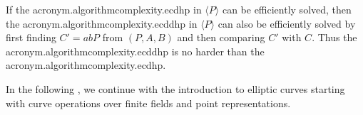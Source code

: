 
If the \acs{acronym.algorithmcomplexity.ecdhp} in $\langle P \rangle$ can be efficiently solved, then the \acs{acronym.algorithmcomplexity.ecddhp} in $\langle P \rangle$ can also be efficiently solved by first finding $C' = abP$ from $(P, A, B)$ and then comparing $C'$ with $C$. Thus the \acs{acronym.algorithmcomplexity.ecddhp} is no harder than the \acs{acronym.algorithmcomplexity.ecdhp}.

In the following , we continue with the introduction to elliptic curves starting with curve operations over finite fields and point representations. 
